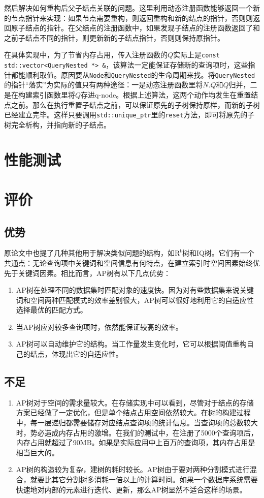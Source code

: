 \documentclass[UTF8]{ctexart}
\begin{document}
然后解决如何重构后父子结点关联的问题。这里利用动态注册函数能够返回一个新的节点指针来实现：如果节点需要重构，则返回重构和新的结点的指针，否则则返回原子结点的指针。在父结点的注册函数中，如果发现子结点的注册函数返回了和之前子结点不同的指针，则更新新的子结点指针，否则则保持原指针。

在具体实现中，为了节省内存占用，传入注册函数的$Q$实际上是\texttt{const std::vector<QueryNested *> \&}，该算法一定能保证存储新的查询项时，这些指针都能顺利取值。原因要从\texttt{Node}和\texttt{QueryNested}的生命周期来找。将\texttt{QueryNested}的指针“落实”为实际的值只有两种途径：一是动态注册函数里将$N.Q$和$Q$归并，二是在构建索引函数里将$Q$存进q-node。根据上述算法，这两个动作均发生在重置结点之前。那么在执行重置子结点之前，可以保证原先的子树保持原样，而新的子树已经建立完毕。这样只要调用\texttt{std::unique\_ptr}里的\texttt{reset}方法，即可将原先的子树完全析构，并指向新的子结点。

\section{性能测试}


\section{评价}
\subsection{优势}
原论文中也提了几种其他用于解决类似问题的结构，如$\mathrm{R^t}$树和IQ树。它们有一个共通点：无论查询项中关键词和空间信息有何特点，在建立索引时空间因素始终优先于关键词因素。相比而言，AP树有以下几点优势：
\begin{enumerate}
    \item AP树在处理不同的数据集时匹配对象的速度快。因为对有些数据集来说关键词和空间两种匹配模式的效率差别很大，AP树可以很好地利用它的自适应性选择最优的匹配方式。
    \item 当AP树应对较多查询项时，依然能保证较高的效率。
    \item AP树可以自动维护它的结构。当工作量发生变化时，它可以根据阈值重构自己的结点，体现出它的自适应性。
\end{enumerate}

\subsection{不足}
\begin{enumerate}
    \item AP树对于空间的需求量较大。在存储实现中可以看到，尽管对于结点的存储方案已经做了一定优化，但是单个结点占用空间依然较大。在树的构建过程中，每一层递归都需要储存对应结点查询项的统计信息。当查询项的总数较大时，势必造成内存占用的激增。在我们的测试中，在注册了5000个查询项后，内存占用就超过了90MB。如果是实际应用中上百万的查询项，其内存占用是相当巨大的。
    \item AP树的构造较为复杂，建树的耗时较长。AP树由于要对两种分割模式进行混合，就要比其它分割树多消耗一倍以上的计算时间。如果一个数据库系统需要快速地对内部的元素进行迭代、更新，那么AP树显然不适合这样的场景。
\end{enumerate}
\end{document}
